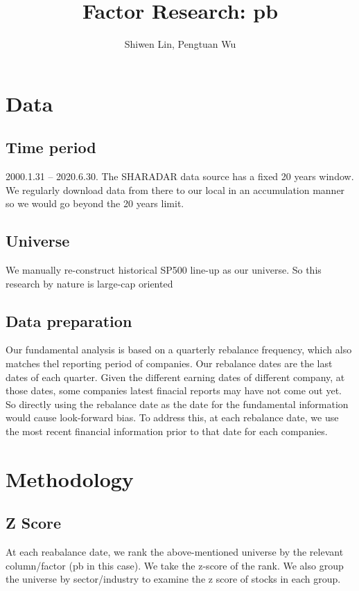 \documentclass[11pt]{article} %
\title{Factor Research: pb}
\author{Shiwen Lin, Pengtuan Wu}
\begin{document}
\maketitle

\section{Data}

\subsection{Time period}
2000.1.31 – 2020.6.30. The SHARADAR data source has a fixed 20 years window. We regularly download data from there to our local in an accumulation manner so we would go beyond the 20 years limit.

\subsection{Universe}
We manually re-construct historical SP500 line-up as our universe. So this research by nature is large-cap oriented

\subsection{Data preparation}
Our fundamental analysis is based on a quarterly rebalance frequency, which also matches thel reporting period of companies. Our rebalance dates are the last dates of each quarter. Given the different earning dates of different company, at those dates, some companies latest finacial reports may have not come out yet. So directly using the rebalance date as the date for the fundamental information would cause look-forward bias. To address this, at each rebalance date, we use the most recent financial information prior to that date for each companies.

\section{Methodology}
\subsection{Z Score}
At each reabalance date, we rank the above-mentioned universe by the relevant column/factor (pb in this case). We take the z-score of the rank. We also group the universe by sector/industry to examine the z score of stocks in each group.
\end{document}
